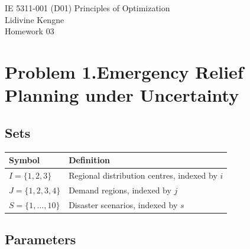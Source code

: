 \documentclass[11pt]{article}
\theoremstyle{definition}\newtheorem*{definition}{Definition}
\theoremstyle{definition}
\begin{document}
\begin{center}
  {\large IE 5311-001 (D01) Principles of Optimization}\\[4pt]
  Lidivine Kengne\\[2pt]
  Homework 03
\end{center}
\vspace{0.6em}

\section*{Problem 1.\quad Emergency Relief Planning under Uncertainty
  \quad[35 pts]}

\subsection*{Sets}

\begin{center}
\begin{tabular}{@{}ll@{}}
\toprule
Symbol & Definition \\
\midrule
$I = \{1,2,3\}$ & Regional distribution centres, indexed by $i$ \\
$J = \{1,2,3,4\}$ & Demand regions, indexed by $j$ \\
$S = \{1,\dots,10\}$ & Disaster scenarios, indexed by $s$ \\
\bottomrule
\end{tabular}
\end{center}

\subsection*{Parameters}
\end{document}

